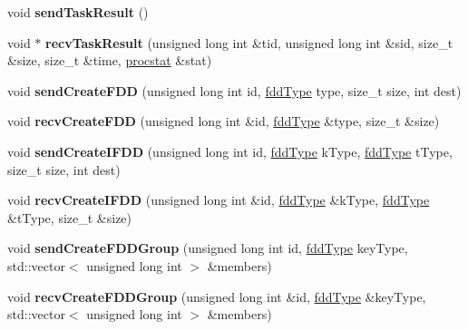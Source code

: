 \begin{DoxyCompactItemize}
void {\bfseries send\+Task\+Result} ()
\item 
\hypertarget{classfaster_1_1fastComm_a41016be2a3623487039d4c40b9762a7c}{}\label{classfaster_1_1fastComm_a41016be2a3623487039d4c40b9762a7c} 
void $\ast$ {\bfseries recv\+Task\+Result} (unsigned long int \&tid, unsigned long int \&sid, size\+\_\+t \&size, size\+\_\+t \&time, \hyperlink{classfaster_1_1procstat}{procstat} \&stat)
\item 
\hypertarget{classfaster_1_1fastComm_aedf068e090c89b62cf23bb060ed98bd8}{}\label{classfaster_1_1fastComm_aedf068e090c89b62cf23bb060ed98bd8} 
void {\bfseries send\+Create\+F\+DD} (unsigned long int id, \hyperlink{namespacefaster_aa8898687bc64536b60a3d5f365060cd6}{fdd\+Type} type, size\+\_\+t size, int dest)
\item 
\hypertarget{classfaster_1_1fastComm_a6335e73103253b835208bbb3b15a318a}{}\label{classfaster_1_1fastComm_a6335e73103253b835208bbb3b15a318a} 
void {\bfseries recv\+Create\+F\+DD} (unsigned long int \&id, \hyperlink{namespacefaster_aa8898687bc64536b60a3d5f365060cd6}{fdd\+Type} \&type, size\+\_\+t \&size)
\item 
\hypertarget{classfaster_1_1fastComm_a1b714530bd2e7c2e0c6a65480bdf5dcf}{}\label{classfaster_1_1fastComm_a1b714530bd2e7c2e0c6a65480bdf5dcf} 
void {\bfseries send\+Create\+I\+F\+DD} (unsigned long int id, \hyperlink{namespacefaster_aa8898687bc64536b60a3d5f365060cd6}{fdd\+Type} k\+Type, \hyperlink{namespacefaster_aa8898687bc64536b60a3d5f365060cd6}{fdd\+Type} t\+Type, size\+\_\+t size, int dest)
\item 
\hypertarget{classfaster_1_1fastComm_a81974b476357e1d465268d58b14de068}{}\label{classfaster_1_1fastComm_a81974b476357e1d465268d58b14de068} 
void {\bfseries recv\+Create\+I\+F\+DD} (unsigned long int \&id, \hyperlink{namespacefaster_aa8898687bc64536b60a3d5f365060cd6}{fdd\+Type} \&k\+Type, \hyperlink{namespacefaster_aa8898687bc64536b60a3d5f365060cd6}{fdd\+Type} \&t\+Type, size\+\_\+t \&size)
\item 
\hypertarget{classfaster_1_1fastComm_a66d4d60b7222f81167428594a26d1138}{}\label{classfaster_1_1fastComm_a66d4d60b7222f81167428594a26d1138} 
void {\bfseries send\+Create\+F\+D\+D\+Group} (unsigned long int id, \hyperlink{namespacefaster_aa8898687bc64536b60a3d5f365060cd6}{fdd\+Type} key\+Type, std\+::vector$<$ unsigned long int $>$ \&members)
\item 
\hypertarget{classfaster_1_1fastComm_a7c04292c7b224a00fbe414e6d22d4bf4}{}\label{classfaster_1_1fastComm_a7c04292c7b224a00fbe414e6d22d4bf4} 
void {\bfseries recv\+Create\+F\+D\+D\+Group} (unsigned long int \&id, \hyperlink{namespacefaster_aa8898687bc64536b60a3d5f365060cd6}{fdd\+Type} \&key\+Type, std\+::vector$<$ unsigned long int $>$ \&members)

\end{DoxyCompactItemize}
